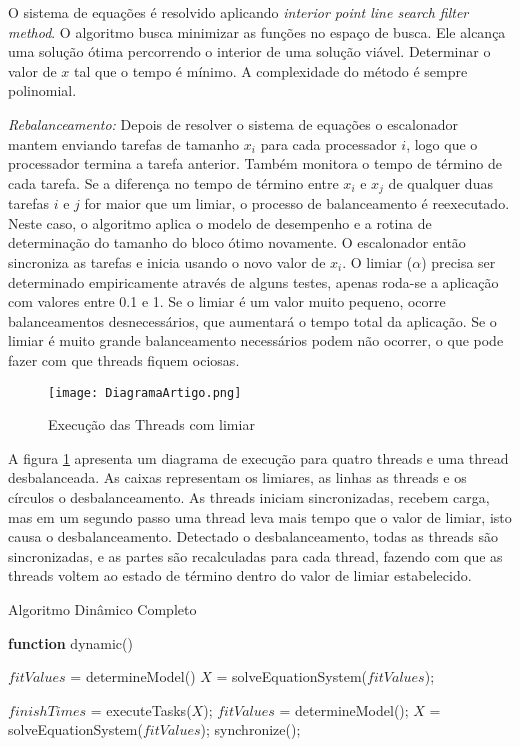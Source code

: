 O sistema de equações é resolvido aplicando  \emph{interior point line search filter method}. O algoritmo busca minimizar as funções no espaço de busca. Ele alcança uma solução ótima percorrendo o interior de uma solução viável. Determinar o valor de $x$ tal que o tempo é mínimo. A complexidade do método é sempre polinomial.

\textit{Rebalanceamento:} Depois de resolver o sistema de equações o escalonador mantem enviando tarefas de tamanho $x_i$ para cada processador $i$, logo que o processador termina a tarefa anterior. Também monitora o tempo de término de cada tarefa. Se a diferença no tempo de término entre $x_i$ e $x_j$ de qualquer duas tarefas $i$ e $j$ for maior que um limiar, o processo de balanceamento é reexecutado. Neste caso, o algoritmo aplica o modelo de desempenho e a rotina de determinação do tamanho do bloco ótimo novamente. O escalonador então sincroniza as tarefas e inicia usando o novo valor de $x_i$. O limiar ($\alpha$) precisa ser determinado empiricamente através de alguns testes, apenas roda-se a aplicação com valores entre 0.1 e 1. Se o limiar é um valor muito pequeno, ocorre balanceamentos desnecessários, que aumentará o tempo total da aplicação. Se o limiar é muito grande balanceamento necessários podem não ocorrer, o que pode fazer com que threads fiquem ociosas.

\begin{figure}[!t]
	\centering
			\texttt{[image: DiagramaArtigo.png]}
	\caption{Execução das Threads com limiar}
	\label{fig:Diagrama}
\end{figure}

A figura \ref{fig:Diagrama} apresenta um diagrama de execução para quatro threads e uma thread desbalanceada. As caixas representam os limiares, as linhas as threads e os círculos o desbalanceamento. As threads iniciam sincronizadas, recebem carga, mas em um segundo passo uma thread leva mais tempo que o valor de limiar, isto causa o desbalanceamento. Detectado o desbalanceamento, todas as threads são sincronizadas, e as partes são recalculadas para cada thread, fazendo com que as threads voltem ao estado de término dentro do valor de limiar estabelecido.



\begin{algorithm}

\caption{Algoritmo Dinâmico Completo}
\label{alg1}

\begin{algorithmic}		

\STATE \textbf{function} dynamic()

\STATE $fitValues$ = determineModel()
\STATE $X$ = solveEquationSystem($fitValues$);


	\STATE $finishTimes$ = executeTasks($X$);
		\STATE $fitValues$ = determineModel();
                \STATE $X$ = solveEquationSystem($fitValues$);
                \STATE synchronize();
    	\ENDIF
\ENDWHILE

\end{algorithmic}
\end{algorithm}

